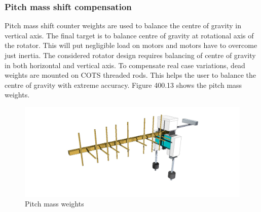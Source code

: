 \subsubsection*{Pitch mass shift compensation} 
Pitch mass shift counter weights are used to balance the centre of gravity in vertical axis. The final target is to balance centre of gravity at rotational axis of the rotator. This will put negligible load on motors and motors have to overcome just inertia. The considered rotator design requires balancing of centre of gravity in both horizontal and vertical axis.  To compensate real case variations, dead weights are mounted on COTS threaded rods. This helps the user to balance the centre of gravity with extreme accuracy. Figure 400.13 shows the pitch mass weights. 


\begin{figure}[H]
	\centering
	\includegraphics[width=1\textwidth]{../art/isoshield.jpg}
	\caption{Pitch mass weights}
\end{figure}
